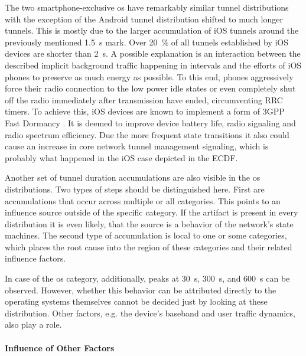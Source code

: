 The two smartphone-exclusive \gls{os} have remarkably similar tunnel distributions with the exception of the Android tunnel distribution shifted to much longer tunnels. This is mostly due to the larger accumulation of iOS tunnels around the previously mentioned \SI{1.5}{\second} mark. Over \SI{20}{\percent} of all tunnels established by iOS devices are shorter than \SI{2}{\second}. A possible explanation is an interaction between the described implicit background traffic happening in intervals and the efforts of iOS phones to preserve as much energy as possible. 
To this end, phones aggressively force their radio connection to the low power idle states or even completely shut off the radio immediately after transmission have ended, circumventing \gls{RRC} timers. To achieve this, iOS devices are known to implement a form of \gls{3GPP} Fast Dormancy \cite{gsma2011fdbestpract}. It is deemed to improve device battery life, radio signaling and radio spectrum efficiency. Due the more frequent state transitions it also could cause an increase in core network tunnel management signaling, which is probably what happened in the iOS case depicted in the \gls{ECDF}.

Another set of tunnel duration accumulations are also visible in the \gls{os} distributions. Two types of steps should be distinguished here. First are accumulations that occur across multiple or all categories. This points to an influence source outside of the specific category. If the artifact is present in every distribution it is even likely, that the source is a behavior of the network's state machines. The second type of accumulation is local to one or some categories, which places the root cause into the region of these categories and their related influence factors. 

In case of the \gls{os} category, additionally, peaks at \SI{30}{\second}, \SI{300}{\second}, and \SI{600}{\second} can be observed. However, whether this behavior can be attributed directly to the operating systems themselves cannot be decided just by looking at these distribution. Other factors, e.g. the device's baseband and user traffic dynamics, also play a role. 


\paragraph{Influence of Other Factors}

